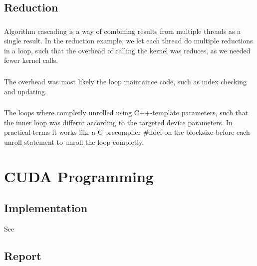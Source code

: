 \documentclass[english,a4paper,numbers=noenddot]{article}
\begin{document}
\subsection{Reduction}
\subsubsection{}
Algorithm cascading is a way of combining results from multiple threads as a single result.
In the reduction example, we let each thread do multiple reductions in a loop, such that the overhead of calling the kernel was reduces, as we needed fewer kernel calls.

\subsubsection{}
The overhead was most likely the loop maintaince code, such as index checking and updating.

\subsubsection{}
The loops where completly unrolled using C++-template parameters, such that the inner loop was differnt according to the targeted device parameters. In practical terms it works like a C precompiler \#ifdef on the blocksize before each unroll statement to unroll the loop completly.

\section{CUDA Programming}
\subsection{Implementation}
See 
\subsection{Report}
\end{document}
